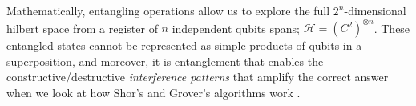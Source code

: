 Mathematically, entangling operations allow us to explore the full $2^n$-dimensional hilbert space
from a register of $n$ independent qubits spans; $\mathcal{H} = (C^2)^{\otimes n}$.
These entangled states cannot be represented as simple products of qubits in a superposition,
and moreover, it is entanglement that enables the constructive/destructive \emph{interference patterns}
that amplify the correct answer when we look at how Shor's and Grover's algorithms work \cite{Nielsen:2010}.














